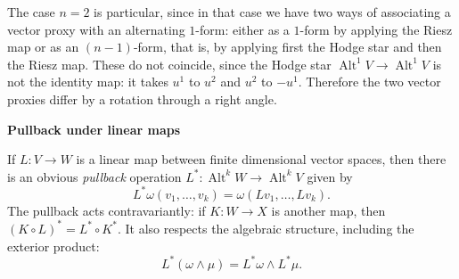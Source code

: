 {The case $n=2$ is particular, since in that case we have two ways of associating a vector proxy with an alternating $1$-form: either as a $1$-form by applying the Riesz map or as an $(n-1)$-form, that is, by applying first the Hodge star and then the Riesz map. These do not coincide, since the Hodge star $\operatorname{Alt}^1V\to\operatorname{Alt}^1V$ is not the identity map: it takes $u^1$ to $u^2$ and $u^2$ to $-u^1$. Therefore the two vector proxies differ by a rotation through a right angle.}

\medskip\noindent\textbf{{Pullback under linear maps}}\par
{If $L:V\to W$ is a linear map between finite dimensional vector spaces, then there is an obvious \emph{pullback} operation $L^*:\operatorname{Alt}^kW\to\operatorname{Alt}^kV$ given by}
\begin{equation}\label{eq:linear-pullback-definition}
L^*\omega(v_1,\ldots,v_k)=\omega(Lv_1,\ldots,Lv_k).
\end{equation}
{The pullback acts contravariantly: if $K:W\to X$ is another map, then $(K\circ L)^*=L^*\circ K^*$. It also respects the algebraic structure, including the exterior product:}
\begin{equation}\label{eq:linear-pullback-wedge}
L^*(\omega\wedge\mu)=L^*\omega\wedge L^*\mu.
\end{equation}

